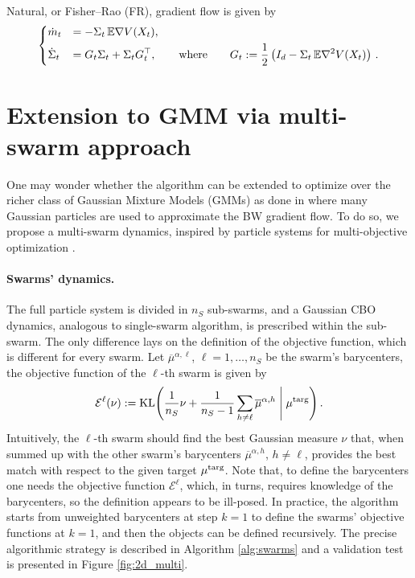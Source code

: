 \documentclass{article}
\theoremstyle{plain}
\theoremstyle{definition}
\theoremstyle{remark}
\newcommand{\KL}{\textup{KL}}
\newcommand{\targ}{\textup{targ}}
\newcommand{\swarm}{S}
\newcommand{\rev}{}
\begin{document}
{\begin{itemize}
Natural, or Fisher--Rao (FR), gradient flow \cite{barfoot2020multivariate,liero2025evolution} is given by
\begin{equation}
\begin{dcases}
\dot{m}_t &= -\Sigma_t\,\mathbb{E}\nabla V(X_t),\\
\dot{\Sigma}_t &= G_t\Sigma_t+\Sigma_t G_t^\top,
\qquad \textup{where} \qquad G_t
:=
\frac12\left(I_d-\Sigma_t\,\mathbb{E}\nabla^2V(X_t)\right)\, .
\end{dcases}
\end{equation}
\end{itemize}
}


\rev{
\section{Extension to GMM via multi-swarm approach}
\label{app:gmm}

One may wonder whether the algorithm can be extended to optimize over the richer class of Gaussian Mixture Models (GMMs) as done in \cite{lambert2022variational} where many Gaussian particles are used to approximate the BW gradient flow. To do so, we propose a multi-swarm dynamics, inspired by particle systems for multi-objective optimization \cite{klamroth2024consensus,borghi2023adaptive}.

\paragraph{Swarms' dynamics.}  The full particle system is divided in $n_\swarm$ sub-swarms, and a Gaussian CBO dynamics, analogous to single-swarm algorithm, is prescribed within the sub-swarm. The only difference lays on the definition of the objective function, which is different for every swarm. Let $\overline{\mu}^{\alpha,\ell}$, $\ell = 1,\dots, n_{\swarm}$ be the swarm's barycenters, the objective function of the $\ell$-th swarm is given by
\begin{equation*} \label{eq:locKL} \mathcal{E}^\ell(\nu) := \KL \Bigg( \frac1{n_\swarm}\nu + \frac1{n_\swarm-1}\sum_{ h \neq \ell} \overline{\mu}^{\alpha, h} \; \Bigg |\; \mu^\targ \Bigg)\,.
\end{equation*}
Intuitively, the  $\ell$-th swarm should find the best Gaussian measure $\nu$ that, when summed up with the other swarm's barycenters  $\overline{\mu}^{\alpha, h}$, $h\neq \ell$, provides the best match with respect to the given target $\mu^\targ$.
Note that, to define the barycenters one needs the objective function $\mathcal{E}^\ell$, which, in turns, requires knowledge of the barycenters, so the definition appears to be ill-posed. In practice, the algorithm starts from unweighted barycenters at step $k =1$ to define the swarms' objective functions at $k = 1$, and then the objects can be defined recursively. The precise algorithmic strategy is described in Algorithm \ref{alg:swarms} and a validation test is presented in Figure \ref{fig:2d_multi}.

}
\end{document}
